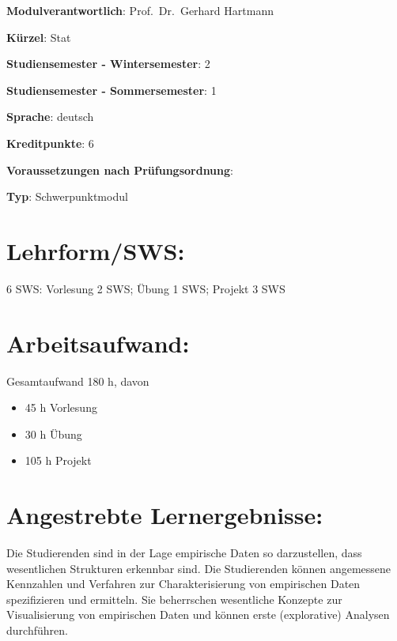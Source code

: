 \begin{modulHead}
\textbf{Modulverantwortlich}: Prof.~Dr.~Gerhard
Hartmann
\end{modulHead}
\begin{modulHead}
\textbf{Kürzel}:
Stat
\end{modulHead}
\begin{modulHead}
\textbf{Studiensemester -
Wintersemester}:
2
\end{modulHead}
\begin{modulHead}
\textbf{Studiensemester -
Sommersemester}: 1
\end{modulHead}
\begin{modulHead}
\textbf{Sprache}:
deutsch
\end{modulHead}
\begin{modulHead}
\textbf{Kreditpunkte}:
6
\end{modulHead}
\begin{modulHead}
\textbf{Voraussetzungen nach
Prüfungsordnung}: 
\end{modulHead}
\begin{modulHead}
\textbf{Typ}:
Schwerpunktmodul
\end{modulHead}


\section*{Lehrform/SWS:}\label{lehrformsws-7}

6 SWS: Vorlesung 2 SWS; Übung 1 SWS; Projekt 3 SWS

\section*{Arbeitsaufwand:}\label{arbeitsaufwand-12}

Gesamtaufwand 180 h, davon

\begin{itemize}
\tightlist
\item
  45 h Vorlesung
\item
  30 h Übung
\item
  105 h Projekt
\end{itemize}

\section*{Angestrebte
Lernergebnisse:}\label{angestrebte-lernergebnisse-6}

Die Studierenden sind in der Lage empirische Daten so darzustellen, dass
wesentlichen Strukturen erkennbar sind. Die Studierenden können
angemessene Kennzahlen und Verfahren zur Charakterisierung von
empirischen Daten spezifizieren und ermitteln. Sie beherrschen
wesentliche Konzepte zur Visualisierung von empirischen Daten und können
erste (explorative) Analysen durchführen.

